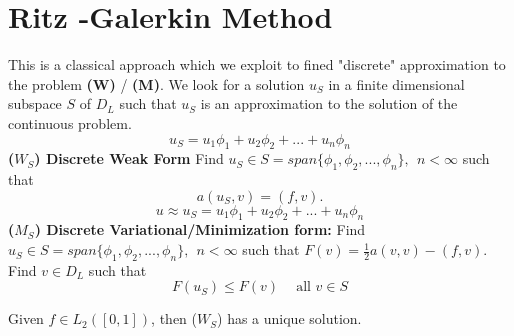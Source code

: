 \section{Ritz -Galerkin Method}
This is a classical approach which we exploit to fined "discrete" approximation to
the problem \textbf{(W)} / \textbf{(M)}. We look for a solution $u_S$ in a finite
dimensional subspace $S $ of $D_L$ such that $u_S$ is an approximation to the solution of the continuous problem.\\
\[u_S=u_1\phi_1+u_2\phi_2 + ...+u_n\phi_n \]
\textbf{($W_S$) Discrete Weak Form} Find $u_{S} \in S = span\{\phi_1,\phi_2,...,\phi_n \}, \ \ n< \infty$ such that
\[a(u_S,v)=(f,v).\]
\[u\approx u_S=u_1\phi_1+u_2\phi_2 + ...+u_n\phi_n \]
\textbf{($M_S$) Discrete Variational/Minimization form:}  Find $u_{S} \in S = span\{\phi_1,\phi_2,...,\phi_n \}, \ \ n< \infty$ such that
$F(v)=\frac{1}{2}a(v,v)-(f,v)$. Find $v \in D_L$ such that
\[F(u_S) \leq F(v) \ \ \ \ \mbox{ all } v\in S\]
\begin{theorem}
Given $f\in L_2([0,1])$, then ($W_S$) has a unique solution.
\end{theorem}

